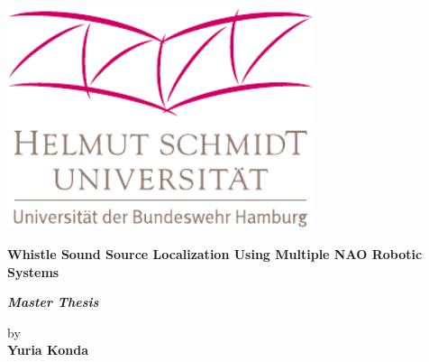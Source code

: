 
\begin{titlepage}
    \label{sec:title}

    \large
    \begin{center}

        \href{http://www.unibw-hamburg.de}
        {%
            \includegraphics[width = 9cm]{figures/hsu/HSU-logo_farbe}
        }

        \vspace{2cm}

        \begin{minipage}{.9\linewidth}
            {\centering\Huge\bf Whistle Sound Source Localization Using Multiple NAO Robotic Systems\par}
        \end{minipage}

        \large


        \vspace{1.5cm}
        {\huge{\bf \it Master Thesis} %
        }

        \vspace{0.6cm}
        {
        \Large by \\[.5cm]
        {\bf \LARGE \huge Yuria Konda}\\[1.5cm]
        }


\end{center}
\end{titlepage}
